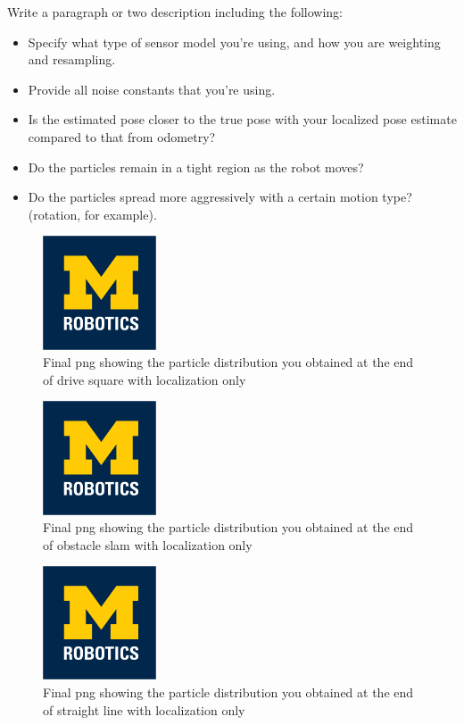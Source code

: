 \documentclass[journal,onecolumn]{IEEEtran}
\begin{document}
 Write a paragraph or two description including the following:
 \begin{itemize}
    \item Specify what type of sensor model you're using, and how you are weighting and resampling.
    \item Provide all noise constants that you're using.
    \item Is the estimated pose closer to the true pose with your localized pose estimate compared to that from odometry?
    \item Do the particles remain in a tight region as the robot moves?
    \item Do the particles spread more aggressively with a certain motion type? (rotation, for example).
\end{itemize}

\begin{figure}[H]
\centering
\includegraphics[width=0.3\textwidth]{Media/template-robotics.jpg}
\caption{Final png showing the particle distribution you obtained at the end of drive square with localization only}
\end{figure}

\begin{figure}[H]
\centering
\includegraphics[width=0.3\textwidth]{Media/template-robotics.jpg}
\caption{Final png showing the particle distribution you obtained at the end of obstacle slam with localization only}
\end{figure}


\begin{figure}[H]
\centering
\includegraphics[width=0.3\textwidth]{Media/template-robotics.jpg}
\caption{Final png showing the particle distribution you obtained at the end of straight line with localization only}
\end{figure}
\end{document}
